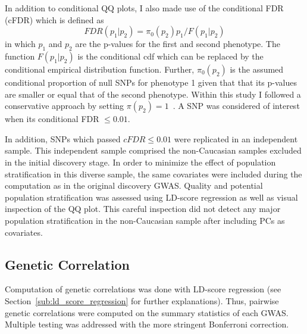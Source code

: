 In addition to conditional QQ plots, I also made use of the conditional FDR (cFDR) which is defined as~\cite{Andreassen2013}
\begin{equation}
  FDR(p_1|p_2)=\pi_0(p_2)p_1/F(p_1|p_2)
\end{equation}
in which $p_1$ and $p_2$ are the p-values for the first and second phenotype.
The function $F(p_1|p_2)$ is the conditional cdf which can be replaced by the conditional empirical distribution function.
Further, $\pi_0(p_2)$ is the assumed conditional proportion of null SNPs for phenotype 1 given that that its p-values are smaller or equal that of the second phenotype.
Within this study I followed a conservative approach by setting $\pi(p_2)=1$~\cite{Andreassen2013}.
A SNP was considered of interest when its conditional FDR $\leq 0.01$.

In addition, SNPs which passed $cFDR\leq 0.01$ were replicated in an independent sample.
This independent sample comprised the non-Caucasian samples excluded in the initial discovery stage.
In order to minimize the effect of population stratification in this diverse sample, the same covariates were included during the computation as in the original discovery GWAS\@.
Quality and potential population stratification was assessed using LD-score regression as well as visual inspection of the QQ plot.
This careful inspection did not detect any major population stratification in the non-Caucasian sample after including PCs as covariates.

\subsection{Genetic Correlation}
\label{sub:genetic_correlation_ukb_assoc}

Computation of genetic correlations was done with LD-score regression (see Section~\ref{sub:ld_score_regression} for further explanations).
Thus, pairwise genetic correlations were computed on the summary statistics of each GWAS\@.
Multiple testing was addressed with the more stringent Bonferroni correction.
